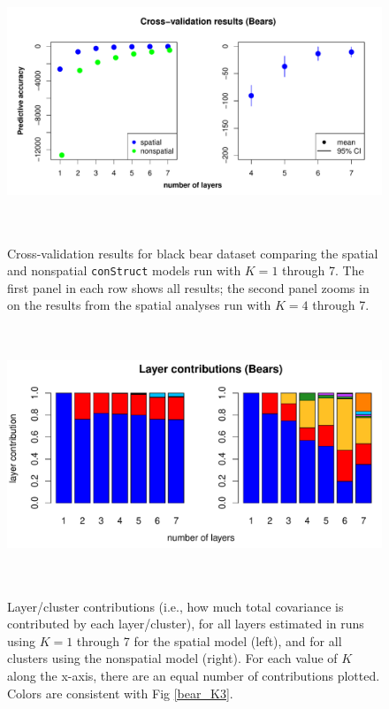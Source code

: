 \documentclass[10pt,letterpaper]{article}
\begin{document}
\begin{figure}
	\centering
		{\includegraphics[width=6in,height=3in]{figs/bears/bear_std_xval.pdf}}
	\caption{
	Cross-validation results for black bear dataset 
	comparing the spatial and nonspatial \texttt{conStruct} models run with $K=1$ through 7.  
	The first panel in each row shows all results; 
	the second panel zooms in on the results from the spatial analyses run with $K = 4$ through 7.
    }\label{bear_xvals}
\end{figure}

\begin{figure}
	\centering
		{\includegraphics[width=6in,height=3in]{figs/bears/bears_laycon_barplots.pdf}}
	\caption{
	Layer/cluster contributions (i.e., how much total covariance is contributed by each layer/cluster), 
	for all layers estimated in runs using $K = 1$ through 7 
	for the spatial model (left),
	and for all clusters using the nonspatial model (right).
	For each value of $K$ along the x-axis, there are an equal number of contributions plotted.
	Colors are consistent with Fig \ref{bear_K3}.
    }\label{bear_laycon}
\end{figure}
\end{document}

